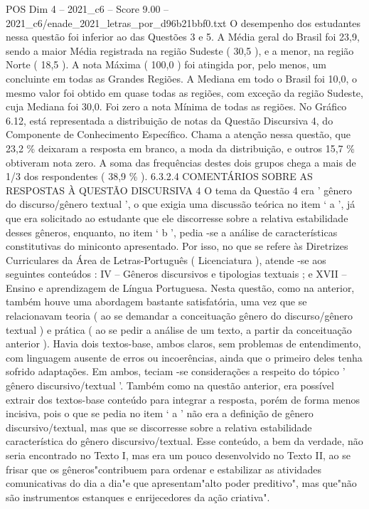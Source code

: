 \begin{textsample}{POS Dim 4 – 2021\_c6 – Score 9.00 – 2021\_c6/enade\_2021\_letras\_por\_d96b21bbf0.txt}
O desempenho dos estudantes nessa questão foi inferior ao das Questões 3 e 5.
A Média geral do Brasil foi 23,9, sendo a maior Média registrada na região Sudeste ( 30,5 ), e a menor, na região Norte ( 18,5 ).
A nota Máxima ( 100,0 ) foi atingida por, pelo menos, um concluinte em todas as Grandes Regiões.
A Mediana em todo o Brasil foi 10,0, o mesmo valor foi obtido em quase todas as regiões, com exceção da região Sudeste, cuja Mediana foi 30,0.
Foi zero a nota Mínima de todas as regiões.
No Gráfico 6.12, está representada a distribuição de notas da Questão Discursiva 4, do Componente de Conhecimento Específico.
Chama a atenção nessa questão, que 23,2 \% deixaram a resposta em branco, a moda da distribuição, e outros 15,7 \% obtiveram nota zero.
A soma das frequências destes dois grupos chega a mais de 1/3 dos respondentes ( 38,9 \% ). 6.3.2.4 COMENTÁRIOS SOBRE AS RESPOSTAS À QUESTÃO DISCURSIVA 4 O tema da Questão 4 era ' gênero do discurso/gênero textual ', o que exigia uma discussão teórica no item ‘ a ’, já que era solicitado ao estudante que ele discorresse sobre a relativa estabilidade desses gêneros, enquanto, no item ‘ b ’, pedia -se a análise de características constitutivas do miniconto apresentado.
Por isso, no que se refere às Diretrizes Curriculares da Área de Letras-Português ( Licenciatura ), atende -se aos seguintes conteúdos : IV – Gêneros discursivos e tipologias textuais ; e XVII – Ensino e aprendizagem de Língua Portuguesa.
Nesta questão, como na anterior, também houve uma abordagem bastante satisfatória, uma vez que se relacionavam teoria ( ao se demandar a conceituação gênero do discurso/gênero textual ) e prática ( ao se pedir a análise de um texto, a partir da conceituação anterior ).
Havia dois textos-base, ambos claros, sem problemas de entendimento, com linguagem ausente de erros ou incoerências, ainda que o primeiro deles tenha sofrido adaptações.
Em ambos, teciam -se considerações a respeito do tópico ' gênero discursivo/textual '.
Também como na questão anterior, era possível extrair dos textos-base conteúdo para integrar a resposta, porém de forma menos incisiva, pois o que se pedia no item ‘ a ’ não era a definição de gênero discursivo/textual, mas que se discorresse sobre a relativa estabilidade característica do gênero discursivo/textual.
Esse conteúdo, a bem da verdade, não seria encontrado no Texto I, mas era um pouco desenvolvido no Texto II, ao se frisar que os gêneros"contribuem para ordenar e estabilizar as atividades comunicativas do dia a dia"e que apresentam"alto poder preditivo", mas que"não são instrumentos estanques e enrijecedores da ação criativa".

\end{textsample}
